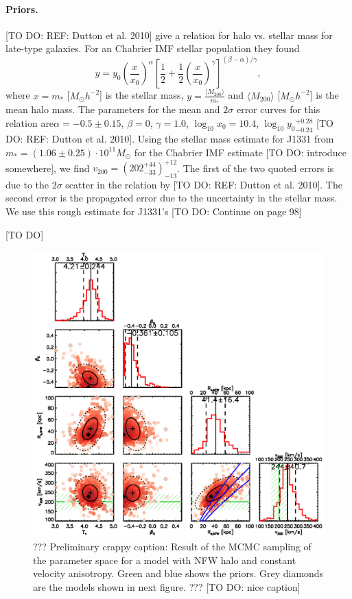 \paragraph{Priors.} [TO DO: REF: Dutton et al. 2010] give a relation for halo vs. stellar mass for late-type galaxies. For an Chabrier IMF stellar population they found
\begin{equation*}
y = y_0 \left( \frac{x}{x_0} \right)^\alpha \left[ \frac 12 + \frac 12 \left(\frac{x}{x_0} \right)^\gamma \right]^{(\beta - \alpha)/\gamma},
\end{equation*}
where $x= m_*$ [$M_\odot h^{-2}$] is the stellar mass, $y = \frac{\langle M_{200}\rangle}{m_*}$ and $\langle M_{200}\rangle$ [$M_\odot h^{-2}$] is the mean halo mass. The parameters for the mean and $2\sigma$ error curves for this relation are$\alpha = -0.5\pm0.15$, $\beta = 0$, $\gamma = 1.0$, $\log_{10} x_0 = 10.4$, $\log_{10} {y_0}_{-0.24}^{+0.28}$ [TO DO: REF: Dutton et al. 2010]. Using the stellar mass estimate for J1331 from \citet{SWELLSI} $m_* = (1.06 \pm 0.25) \cdot 10^{11} M_\odot$ for the Chabrier IMF estimate [TO DO: introduce somewhere], we find ${v_{200}} = (202_{-33}^{+44})_{-13}^{+12}$. The first of the two quoted errors is due to the $2\sigma$ scatter in the relation by [TO DO: REF: Dutton et al. 2010]. The second error is the propagated error due to the uncertainty in the stellar mass. We use this rough estimate for J1331's [TO DO: Continue on page 98]



[TO DO]

\begin{figure}
\centering
\includegraphics[width=0.9\linewidth]{fig/B4_contour_plot_short.ps}
\caption{??? Preliminary crappy caption: Result of the MCMC sampling of the parameter space for a model with NFW halo and constant velocity anisotropy. Green and blue shows the priors. Grey diamonds are the models shown in next figure. ??? [TO DO: nice caption]}
\label{fig:???}
\end{figure}

